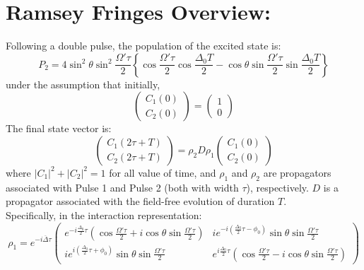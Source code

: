 \documentclass{article}
\begin{document}
\section{Ramsey Fringes Overview:}
\noindent 
Following a double pulse, the population of the excited state is:
\begin{equation*}
\boxed{P_2 = 4\sin^{2}\theta\sin^{2}\frac{\Omega'\tau}{2} \left\lbrace \cos \frac{\Omega'\tau}{2}\cos \frac{\Delta_0 T}{2} - \cos\theta\sin\frac{\Omega'\tau}{2} \sin \frac{\Delta_0 T}{2}\right\rbrace}
\end{equation*}
\noindent 
under the assumption that initially,
\[
\begin{pmatrix}
C_1(0)\\C_2(0)
\end{pmatrix}
=
\begin{pmatrix}
1\\0
\end{pmatrix}
\]
\noindent 
The final state vector is:
\[
\begin{pmatrix}
C_1(2\tau+T)\\C_2(2\tau+T)
\end{pmatrix}
=
\rho_2 D \rho_1
\begin{pmatrix}
C_1(0)\\C_2(0)
\end{pmatrix}
\]
where $|C_1|^2 + |C_2|^2 = 1$ for all value of time, and $\rho_1$ and $\rho_2$ are propagators associated with Pulse 1 and Pulse 2 (both with width $\tau$), respectively. $D$ is a propagator associated with the field-free evolution of duration $T$.\\

\noindent Specifically, in the interaction representation:
\[
\rho_1 = e^{-i\overline\Delta\tau}
\begin{pmatrix}
e^{-i\frac{\Delta_0}{2}\tau}\left(\cos\frac{\Omega'\tau}{2} + i\cos\theta\sin\frac{\Omega'\tau}{2}\right)  
& ie^{-i\left(\frac{\Delta_0}{2}\tau - \phi_0 \right)} \sin\theta\sin\frac{\Omega'\tau}{2} 
\\
ie^{i\left(\frac{\Delta_0}{2}\tau + \phi_0 \right)} \sin\theta\sin\frac{\Omega'\tau}{2} 
& 
e^{i\frac{\Delta_0}{2}\tau}\left(\cos\frac{\Omega'\tau}{2} - i\cos\theta\sin\frac{\Omega'\tau}{2}\right)  
\end{pmatrix}\]
\end{document}
